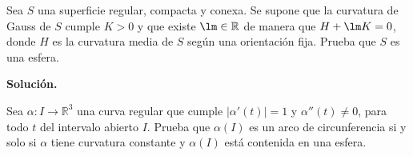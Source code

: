 \documentclass[12pt]{article}
\begin{document}
    \begin{ejercicio}[3 puntos]
        Sea $S$ una superficie regular, compacta y conexa. Se supone que la curvatura de Gauss de $S$ cumple $K>0$ y que existe $\lm\in \mathbb{R}$ de manera que $H+\lm K= 0$, donde $H$ es la curvatura media de $S$ según una orientación fija. Prueba que $S$ es una esfera.
    \end{ejercicio}

    \newpage
    \setcounter{ejercicio}{0}
    \noindent
    \textbf{Solución.}
    
    \begin{ejercicio}[3 puntos]
        Sea $\alpha:I\to\mathbb{R}^3$ una curva regular que cumple $|\alpha'(t)| = 1$ y $\alpha''(t) \neq 0$, para todo $t$ del intervalo abierto $I$. Prueba que $\alpha(I)$ es un arco de circunferencia si y solo si $\alpha$ tiene curvatura constante y $\alpha(I)$ está contenida en una esfera.\\


\end{ejercicio}
\end{document}
